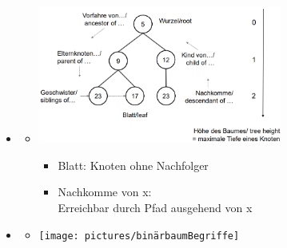 \documentclass[
    12pt,
    a4paper,
    ngerman,
    color=3b,%
    marginpar=false,
    colorback=false,
    leqno,
]{tudaexercise}
\begin{document}
\begin{itemize}
    \item {}
          \begin{itemize}
              \item[]
                    \begin{minipage}[t]{0.45\textwidth}
                        \includegraphics[width=8cm]{pictures/baumBegriffe1.PNG}
                    \end{minipage}
                    \begin{minipage}[t]{0.45\textwidth}
                        \vspace{-3.5cm}
                        \begin{itemize}
                            \item Blatt: Knoten ohne Nachfolger
                            \item Nachkomme von x: \\
                                  Erreichbar durch Pfad ausgehend von x
                        \end{itemize}
                    \end{minipage}
          \end{itemize}
          \clearpage
    \item {}
          \begin{itemize}
              \item[]
                    \begin{minipage}[t]{0.45\textwidth}
                        \texttt{[image: pictures/binärbaumBegriffe]}
                    \end{minipage}
                    \begin{minipage}[t]{0.45\textwidth}
                        \vspace{-4.5cm}

\end{minipage}
\end{itemize}
\end{itemize}
\end{document}

